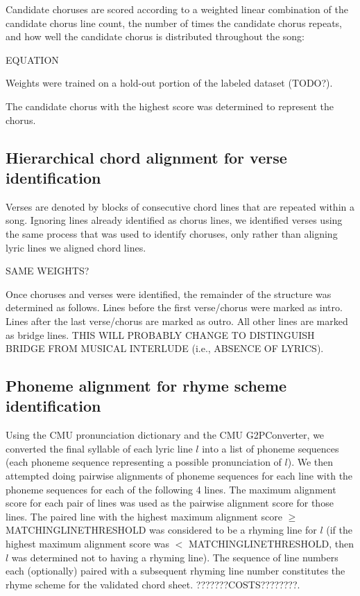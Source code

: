\documentclass[letterpaper]{article}
\begin{document}
Candidate choruses are scored according to a weighted linear combination of the candidate chorus line count, the number of times the candidate chorus repeats, and how well the candidate chorus is distributed throughout the song:

EQUATION

Weights were trained on a hold-out portion of the labeled dataset (TODO?).

The candidate chorus with the highest score was determined to represent the chorus.

\subsection{Hierarchical chord alignment for verse identification}

Verses are denoted by blocks of consecutive chord lines that are repeated within a song. Ignoring lines already identified as chorus lines, we identified verses using the same process that was used to identify choruses, only rather than aligning lyric lines we aligned chord lines. 

SAME WEIGHTS? 

Once choruses and verses were identified, the remainder of the structure was determined as follows. Lines before the first verse/chorus were marked as intro. Lines after the last verse/chorus are marked as outro. All other lines are marked as bridge lines. THIS WILL PROBABLY CHANGE TO DISTINGUISH BRIDGE FROM MUSICAL INTERLUDE (i.e., ABSENCE OF LYRICS).

\subsection{Phoneme alignment for rhyme scheme identification}

Using the CMU pronunciation dictionary and the CMU G2PConverter, we converted the final syllable of each lyric line $l$ into a list of phoneme sequences (each phoneme sequence representing a possible pronunciation of $l$). We then attempted doing pairwise alignments of phoneme sequences for each line with the phoneme sequences for each of the following 4 lines. The maximum alignment score for each pair of lines was used as the pairwise alignment score for those lines. The paired line with the highest maximum alignment score $\ge$ MATCHINGLINETHRESHOLD was considered to be a rhyming line for $l$ (if the highest maximum alignment score was $<$ MATCHINGLINETHRESHOLD, then $l$ was determined not to having a rhyming line). The sequence of line numbers each (optionally) paired with a subsequent rhyming line number constitutes the rhyme scheme for the validated chord sheet. ???????COSTS????????.
\end{document}

